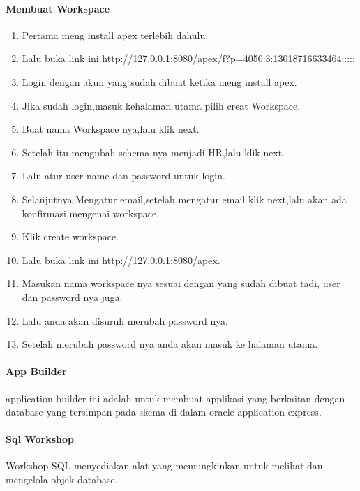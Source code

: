 \documentclass[a4paper,12pt]{report}
\begin{document}
\paragraph{Membuat Workspace}
\begin{enumerate}
\item Pertama meng install apex terlebih dahulu.\\
\item Lalu buka link ini http://127.0.0.1:8080/apex/f?p=4050:3:13018716633464:::::\\
\item Login dengan akun yang sudah dibuat ketika meng install apex.\\
\item Jika sudah login,masuk kehalaman utama pilih creat Workspace.\\
\item Buat nama Workspace nya,lalu klik next.\\
\item Setelah itu mengubah schema nya menjadi HR,lalu klik next.\\
\item Lalu atur user name dan password untuk login.\\
\item Selanjutnya Mengatur email,setelah mengatur email klik next,lalu akan ada konfirmasi mengenai workspace.\\
\item Klik create workspace.\\
\item Lalu buka link ini http://127.0.0.1:8080/apex.\\
\item Masukan nama workspace nya sesuai dengan yang sudah dibuat tadi, user dan password nya juga.\\
\item Lalu anda akan disuruh merubah password nya.\\
\item Setelah merubah password nya anda akan masuk ke halaman utama.\\  
\end{enumerate}
\paragraph{App Builder}
application builder ini adalah untuk membuat applikasi yang berkaitan dengan database yang tersimpan pada skema di dalam oracle application express.\\
\paragraph{Sql Workshop}
Workshop SQL menyediakan alat yang memungkinkan untuk melihat dan mengelola objek database.\\
\end{document}
